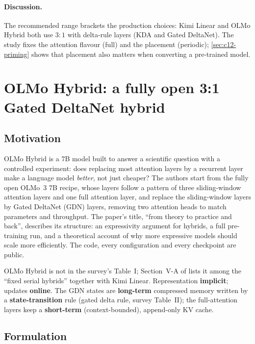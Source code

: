\paragraph{Discussion.} The recommended range brackets the production choices: Kimi Linear and
OLMo Hybrid both use $3{:}1$ with delta-rule layers (KDA and Gated DeltaNet). The study fixes the
attention flavour (full) and the placement (periodic); \cref{sec:c12-priming} shows that placement
also matters when converting a pre-trained model.
\section{OLMo Hybrid: a fully open 3:1 Gated DeltaNet hybrid}\label{sec:c12-olmo}

\subsection{Motivation}

OLMo Hybrid \citep{merrill2026olmohybrid} is a 7B model built to answer a scientific question
with a controlled experiment: does replacing most attention layers by a recurrent layer make a
language model \emph{better}, not just cheaper? The authors start from the fully open OLMo~3 7B
recipe, whose layers follow a pattern of three sliding-window attention layers and one full
attention layer, and replace the sliding-window layers by Gated DeltaNet (GDN) layers, removing
two attention heads to match parameters and throughput. The paper's title, ``from theory to
practice and back'', describes its structure: an expressivity argument for hybrids, a full
pre-training run, and a theoretical account of why more expressive models should scale more
efficiently. The code, every configuration and every checkpoint are public.

\begin{taxonomy}
OLMo Hybrid is not in the survey's Table~I; Section~V-A of \citet{zhoubian2026memory} lists it
among the ``fixed serial hybrids'' together with Kimi Linear. Representation \textbf{implicit};
updates \textbf{online}. The GDN states are \textbf{long-term} compressed memory written by a
\textbf{state-transition} rule (gated delta rule, survey Table~II); the full-attention layers
keep a \textbf{short-term} (context-bounded), append-only KV cache.
\end{taxonomy}

\subsection{Formulation}

